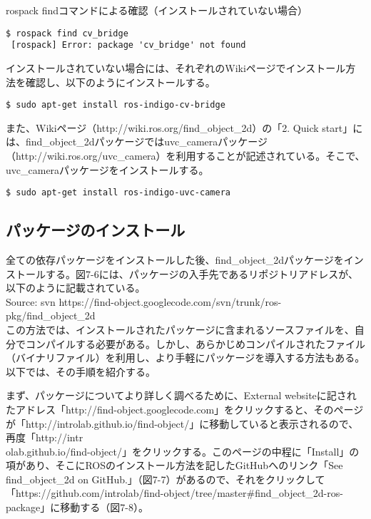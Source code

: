 rospack findコマンドによる確認（インストールされていない場合）

\begin{lstlisting}[language=ROS]
$ rospack find cv_bridge
 [rospack] Error: package 'cv_bridge' not found
\end{lstlisting}

インストールされていない場合には、それぞれのWikiページでインストール方法を確認し、以下のようにインストールする。

\begin{lstlisting}[language=ROS]
$ sudo apt-get install ros-indigo-cv-bridge
\end{lstlisting}

また、Wikiページ（http://wiki.ros.org/find\_object\_2d）の「2. Quick start」には、find\_object\_2dパッケージではuvc\_cameraパッケージ（http://wiki.ros.org/uvc\_camera）を利用することが記述されている。そこで、uvc\_cameraパッケージをインストールする。

\begin{lstlisting}[language=ROS]
$ sudo apt-get install ros-indigo-uvc-camera
\end{lstlisting}

\subsection{パッケージのインストール}

全ての依存パッケージをインストールした後、find\_object\_2dパッケージをインストールする。図7-6には、パッケージの入手先であるリポジトリアドレスが、以下のように記載されている。\\

Source: svn https://find-object.googlecode.com/svn/trunk/ros-pkg/find\_object\_2d\\

この方法では、インストールされたパッケージに含まれるソースファイルを、自分でコンパイルする必要がある。しかし、あらかじめコンパイルされたファイル（バイナリファイル）を利用し、より手軽にパッケージを導入する方法もある。以下では、その手順を紹介する。

まず、パッケージについてより詳しく調べるために、External websiteに記されたアドレス「http://find-object.googlecode.com」をクリックすると、そのページが「http://introlab.github.io/find-object/」に移動していると表示されるので、再度「http://intr\\olab.github.io/find-object/」をクリックする。このページの中程に「Install」の項があり、そこにROSのインストール方法を記したGitHubへのリンク「See find\_object\_2d on GitHub.」（図7-7）があるので、それをクリックして「https://github.com/introlab/find-object/tree/master\#find\_object\_2d-ros-package」に移動する（図7-8）。

